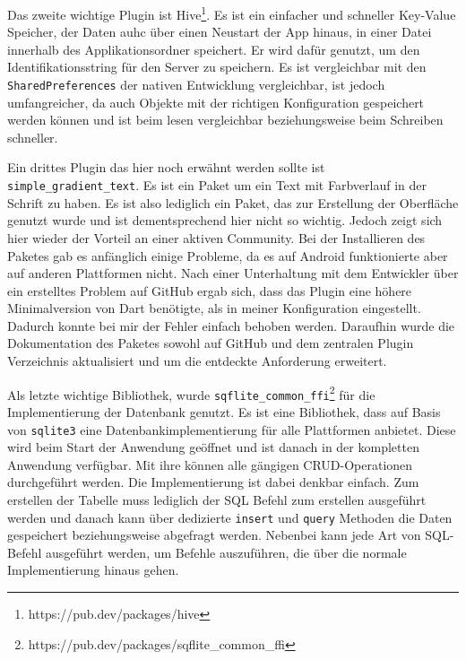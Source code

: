 Das zweite wichtige Plugin ist Hive\footnote{https://pub.dev/packages/hive}. Es ist ein einfacher und schneller Key-Value Speicher, der Daten auhc über einen Neustart der App hinaus, in einer Datei innerhalb des Applikationsordner speichert. Er wird dafür genutzt, um den Identifikationsstring für den Server zu speichern. Es ist vergleichbar mit den \verb|SharedPreferences| der nativen Entwicklung vergleichbar, ist jedoch umfangreicher, da auch Objekte mit der richtigen Konfiguration gespeichert werden können und ist beim lesen vergleichbar beziehungsweise beim Schreiben schneller.

Ein drittes Plugin das hier noch erwähnt werden sollte ist \verb|simple_gradient_text|. Es ist ein Paket um ein Text mit Farbverlauf in der Schrift zu haben. Es ist also lediglich ein Paket, das zur Erstellung der Oberfläche genutzt wurde und ist dementsprechend hier nicht so wichtig. Jedoch zeigt sich hier wieder der Vorteil an einer aktiven Community. Bei der Installieren des Paketes gab es anfänglich einige Probleme, da es auf Android funktionierte aber auf anderen Plattformen nicht. Nach einer Unterhaltung mit dem Entwickler über ein erstelltes Problem auf GitHub ergab sich, dass das Plugin eine höhere Minimalversion von Dart benötigte, als in meiner Konfiguration eingestellt. Dadurch konnte bei mir der Fehler einfach behoben werden. Daraufhin wurde die Dokumentation des Paketes sowohl auf GitHub und dem zentralen Plugin Verzeichnis aktualisiert und um die entdeckte Anforderung erweitert.

Als letzte wichtige Bibliothek, wurde \verb|sqflite_common_ffi|\footnote{https://pub.dev/packages/sqflite\_common\_ffi} für die Implementierung der Datenbank genutzt. Es ist eine Bibliothek, dass auf Basis von \verb|sqlite3| eine Datenbankimplementierung für alle Plattformen anbietet.
Diese wird beim Start der Anwendung geöffnet und ist danach in der kompletten Anwendung verfügbar.
 Mit ihre können alle gängigen \ac{CRUD}-Operationen durchgeführt werden. Die Implementierung ist dabei denkbar einfach.
Zum erstellen der Tabelle muss lediglich der SQL Befehl zum erstellen ausgeführt werden und danach kann über dedizierte \verb|insert| und \verb|query| Methoden die Daten gespeichert beziehungsweise abgefragt werden.
Nebenbei kann jede Art von SQL-Befehl ausgeführt werden, um Befehle auszuführen, die über die normale Implementierung hinaus gehen.



